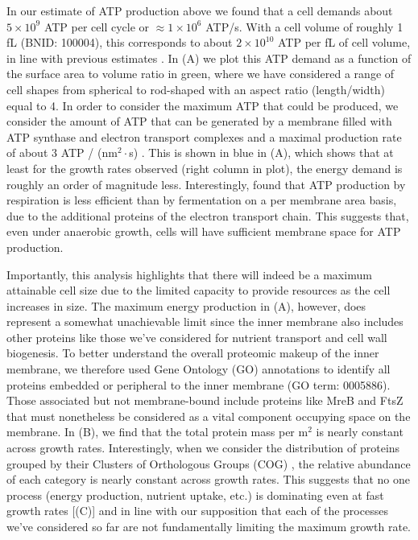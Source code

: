In our estimate of ATP production above we found that a cell demands about $5
\times 10^9$ ATP per cell cycle or $\approx 1 \times 10^6$ ATP/s. With a cell
volume of roughly 1 fL (BNID: 100004), this corresponds to about $2 \times
10^{10}$ ATP per fL of cell volume, in line with previous estimates
\citep{stouthamer1977, szenk2017}. In (A) we plot this ATP
demand as a function of the surface area to volume ratio in green, where we have
considered a range of cell shapes from spherical to rod-shaped with an aspect
ratio (length/width) equal to 4. In order to consider the maximum ATP that could
be produced, we consider the amount of ATP that can be generated by a membrane
filled with ATP synthase and electron transport complexes and a maximal
production rate of about 3 ATP / (nm$^2 \cdot$s) \citep{szenk2017}. This is
shown in blue in (A), which shows that at least for the
growth rates observed (right column in plot), the energy demand is roughly an
order of magnitude less. Interestingly, \cite{szenk2017} found that ATP
production by respiration is less efficient than by fermentation on a per
membrane area basis, due to the additional proteins of the electron transport
chain. This suggests that, even under anaerobic growth, cells will have
sufficient membrane space for ATP production.

Importantly, this analysis highlights that there will indeed be a maximum
attainable cell size due to the limited capacity to provide resources as the
cell increases in size. The maximum energy production in
(A), however, does represent a somewhat unachievable limit
since the inner membrane also includes other proteins like those we've
considered for nutrient transport and cell wall biogenesis. To better understand
the overall proteomic makeup of the inner membrane, we therefore used Gene
Ontology (GO) annotations \citep{ashburner2000, thegeneOntologyconsortium2018}
to identify all proteins embedded or peripheral to the inner membrane (GO term:
0005886). Those associated but not membrane-bound include proteins like MreB and
FtsZ that must nonetheless be considered as a vital component occupying space on
the membrane. In (B), we find that the total protein mass
per \textmu m$^2$ is nearly constant across growth rates. Interestingly, when we
consider the distribution of proteins grouped by their Clusters of Orthologous
Groups (COG) \citep{tatusov2000}, the relative abundance of each category is
nearly constant across growth rates. This suggests that no one process (energy
production, nutrient uptake, etc.) is dominating even at fast growth rates
[(C)] and in line with our supposition that each of the
processes we've considered so far are not fundamentally limiting the maximum
growth rate. 

